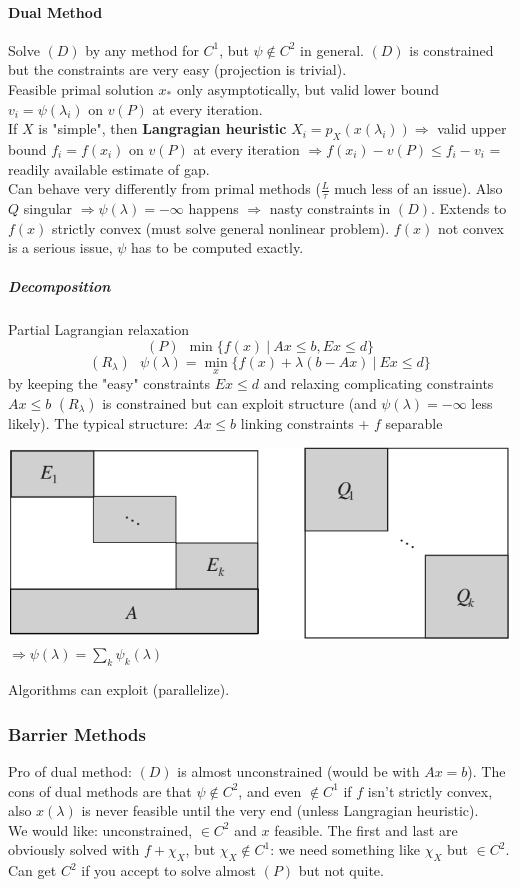 \documentclass[10pt]{report}
\begin{document}
\paragraph{Dual Method} Solve $(D)$ by any method for $C^1$, but $\psi\not\in C^2$ in general. $(D)$ is constrained but the constraints are very easy (projection is trivial).\\
Feasible primal solution $x_*$ only asymptotically, but valid lower bound $v_i = \psi(\lambda_i)$ on $v(P)$ at every iteration.\\
If $X$ is "simple", then \textbf{Langragian heuristic} $X_i = p_X(x(\lambda_i))\Rightarrow$ valid upper bound $f_i = f(x_i)$ on $v(P)$ at every iteration $\Rightarrow f(x_i)-v(P)\leq f_i - v_i$ = readily available estimate of gap.\\
Can behave very differently from primal methods ($\frac{L}{\tau}$ much less of an issue). Also $Q$ singular $\Rightarrow \psi(\lambda)=-\infty$ happens $\Rightarrow$ nasty constraints in $(D)$. Extends to $f(x)$ strictly convex (must solve general nonlinear problem). $f(x)$ not convex is a serious issue, $\psi$ has to be computed exactly.
\subparagraph{Decomposition} Partial Lagrangian relaxation $$(P)\:\:\min\{f(x)\:|\:Ax\leq b, Ex\leq d\}$$
$$(R_\lambda)\:\:\:\psi(\lambda)=\min_x\{f(x)+\lambda(b-Ax)\:|\:Ex\leq d\}$$ by keeping the "easy" constraints $Ex\leq d$ and relaxing complicating constraints $Ax\leq b$
$(R_\lambda)$ is constrained but can exploit structure (and $\psi(\lambda)=-\infty$ less likely). The typical structure: $Ax\leq b$ linking constraints + $f$ separable
\begin{center}
	\includegraphics[scale=0.6]{14.png}\\
	$\Rightarrow \psi(\lambda)=\sum_k \psi_k(\lambda)$
\end{center}
Algorithms can exploit (parallelize).
\subsubsection{Barrier Methods}
Pro of dual method: $(D)$ is almost unconstrained (would be with $Ax = b$). The cons of dual methods are that $\psi\not\in C^2$, and even $\not\in C^1$ if $f$ isn't strictly convex, also $x(\lambda)$ is never feasible until the very end (unless Langragian heuristic).\\
We would like: unconstrained, $\in C^2$ and $x$ feasible. The first and last are obviously solved with $f + \chi_X$, but $\chi_X\not\in C^1$: we need something like $\chi_X$ but $\in C^2$. Can get $C^2$ if you accept to solve almost $(P)$ but not quite.
\end{document}
